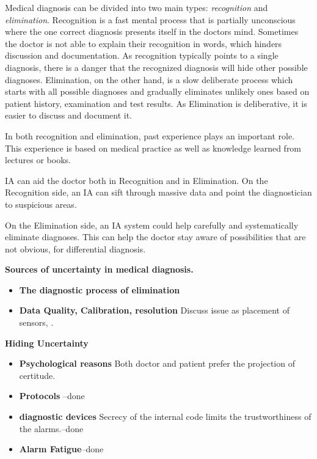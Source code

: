 \documentclass[11pt]{pnas-new}
\begin{document}
Medical diagnosis can be divided into two main types: {\em
  recognition} and {\em elimination}. Recognition is a fast mental
process that is partially unconscious where the one correct diagnosis presents itself in the doctors mind.  Sometimes the doctor is not able to explain their recognition in words, which hinders discussion and documentation.  As recognition 
typically points to a single diagnosis, there is a danger that the
recognized diagnosis will hide other possible diagnoses.
Elimination, on the other hand, is a slow deliberate process  which starts with all possible diagnoses and gradually eliminates
unlikely ones based on patient history, examination and test
results. As Elimination is deliberative, it is easier to discuss and
document it.

In both recognition and elimination, past experience plays an important role. This experience is based on medical practice as well as knowledge learned from lectures or books. 

IA can aid the doctor both in Recognition and in Elimination. On the Recognition side, an IA can sift through massive data and point the diagnostician to suspicious areas.

On the Elimination side, an IA system could help carefully and systematically
eliminate diagnoses. This can help the doctor stay aware of possibilities that are not obvious, for differential diagnosis.

{\bf Sources of uncertainty in medical diagnosis.}
\begin{itemize}
  \item{\bf The diagnostic process of elimination}
  \item{\bf Data Quality, Calibration, resolution} Discuss issue as placement of sensors, .
  \end{itemize}

 {\bf Hiding Uncertainty}
  \begin{itemize}
    \item {\bf Psychological reasons} Both doctor and patient prefer
      the projection of certitude.
    \item {\bf Protocols} --done
    \item {\bf diagnostic devices} Secrecy of the internal code limits
      the trustworthiness of the alarms.--done
    \item{\bf Alarm Fatigue}--done
  \end{itemize}
\end{document}
